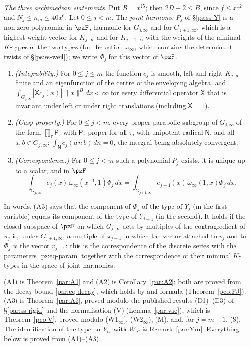 \documentclass[10pt]{amsart}
\theoremstyle{definition}
\theoremstyle{remark}
\begin{document}
\emph{The three archimedean statements.} Put $B=x^{25}$; then $2D+2\le B$, since $f\le x^{12}$ and
$N_j\le n_m\le40x^6$. Let $0\le j<m$. The \emph{joint harmonic} $P_j$ of \S\ref{ps:ss-Y} is a
non-zero polynomial in $\pzF$, harmonic for $G_{j,\infty}$ and for $G_{j+1,\infty}$, which is a
highest weight vector for $K_{j,\infty}$ and for $K_{j+1,\infty}$ with the weights of the minimal
$K$-types of the two types (for the action $\omega_\infty$, which contains the determinant twists
of \S\ref{ps:ss-weil}); we write $\Phi_j$ for this vector of $\pzF$.
\begin{enumerate}
\item[(A1)] \emph{(Integrability.)} For $0\le j\le m$ the function $c_j$ is smooth, left and right
$K_{j,\infty}$-finite and an eigenfunction of the centre of the enveloping algebra, and
$\int_{G_{j,\infty}}|\mathsf Xc_j(x)|\,\|x\|^{B}dx<\infty$ for every differential
operator $\mathsf X$ that is invariant under left or under right translations (including
$\mathsf X=1$).
\item[(A2)] \emph{(Cusp property.)} For $0\le j<m$, every proper parabolic subgroup of
$G_{j,\infty}$ of the form $\prod_\tau\mathsf P_\tau$ with $\mathsf P_\tau$ proper for all $\tau$,
with unipotent radical $\mathsf N$, and all $a,b\in G_{j,\infty}$: $\int_{\mathsf N}c_j(a\,n\,b)\,dn=0$,
the integral being absolutely convergent.
\item[(A3)] \emph{(Correspondence.)} For $0\le j<m$ such a polynomial $P_j$ exists, it is unique up
to a scalar, and in $\pzF$
\[
\int_{G_{j,\infty}}e_j(x)\,\omega_\infty(x^{-1},1)\Phi_j\,dx=\int_{G_{j+1,\infty}}e_{j+1}(x)\,
\omega_\infty(1,x)\Phi_j\,dx .
\]
\end{enumerate}
In words, (A3) says that the component of $\Phi_j$ of the type of $Y_j$ (in the first variable)
equals its component of the type of $Y_{j+1}$ (in the second). It holds if the closed subspace of
$\pzF$ on which $G_{j,\infty}$ acts by multiples of the contragredient of $\pi_j$ is, under
$G_{j+1,\infty}$, a multiple of $\pi_{j+1}$ in which the vector attached to $v_j$ and to $\Phi_j$
is the vector $v_{j+1}$: this is the correspondence of the discrete series with the parameters
\eqref{pz:eq-param} together with the correspondence of their minimal $K$-types in the space of
joint harmonics.

\smallskip\noindent (A1) is Theorem~\ref{par:A1} and (A2) is Corollary~\ref{par:A2}; both are proved from the
decay bound \eqref{par:eq-decay}, which holds by {\cite[Theorem~5.6]{P51}} and formula
{\cite[(59)]{P51}} (Theorem~\ref{pco:FJ}). (A3) is Theorem~\ref{par:A3}, proved modulo the published
results (D1)--(D3) of \S\ref{par:ss-rigid} and the normalisation (V) (Lemma~\ref{par:vac}), which is
Theorem~\ref{pco:V}, proved modulo (W1$_\infty$), (W2$_\infty$), (M), and, for $j=m-1$, (S). The
identification of the type on $Y_m$ with $W_{\lambda^\circ}$ is Remark~\ref{par:Ym}. Everything below
is proved from (A1)--(A3).\par\smallskip
\end{document}
